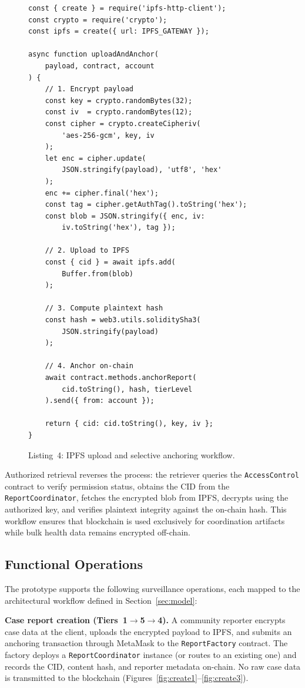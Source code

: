 \begin{figure}[!ht]
\begin{verbatim}
const { create } = require('ipfs-http-client');
const crypto = require('crypto');
const ipfs = create({ url: IPFS_GATEWAY });

async function uploadAndAnchor(
    payload, contract, account
) {
    // 1. Encrypt payload
    const key = crypto.randomBytes(32);
    const iv  = crypto.randomBytes(12);
    const cipher = crypto.createCipheriv(
        'aes-256-gcm', key, iv
    );
    let enc = cipher.update(
        JSON.stringify(payload), 'utf8', 'hex'
    );
    enc += cipher.final('hex');
    const tag = cipher.getAuthTag().toString('hex');
    const blob = JSON.stringify({ enc, iv:
        iv.toString('hex'), tag });

    // 2. Upload to IPFS
    const { cid } = await ipfs.add(
        Buffer.from(blob)
    );

    // 3. Compute plaintext hash
    const hash = web3.utils.soliditySha3(
        JSON.stringify(payload)
    );

    // 4. Anchor on-chain
    await contract.methods.anchorReport(
        cid.toString(), hash, tierLevel
    ).send({ from: account });

    return { cid: cid.toString(), key, iv };
}
\end{verbatim}
\caption*{Listing~4: IPFS upload and selective anchoring workflow.}\label{lst:ipfs}
\end{figure}

Authorized retrieval reverses the process: the retriever queries the \texttt{AccessControl} contract to verify permission status, obtains the CID from the \texttt{ReportCoordinator}, fetches the encrypted blob from IPFS, decrypts using the authorized key, and verifies plaintext integrity against the on-chain hash. This workflow ensures that blockchain is used exclusively for coordination artifacts while bulk health data remains encrypted off-chain.

\subsection{Functional Operations}\label{subsec:operations}

The prototype supports the following surveillance operations, each mapped to the architectural workflow defined in Section~\ref{sec:model}:

\textbf{Case report creation (Tiers~1$\rightarrow$5$\rightarrow$4).} A community reporter encrypts case data at the client, uploads the encrypted payload to IPFS, and submits an anchoring transaction through MetaMask to the \texttt{ReportFactory} contract. The factory deploys a \texttt{ReportCoordinator} instance (or routes to an existing one) and records the CID, content hash, and reporter metadata on-chain. No raw case data is transmitted to the blockchain (Figures~\ref{fig:create1}--\ref{fig:create3}).

